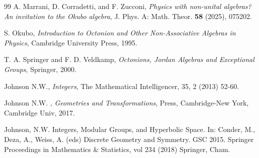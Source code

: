\documentclass{birkjour}
\numberwithin{equation}{section}
\begin{document}
\begin{thebibliography}{99}
A. Marrani, D. Corradetti, and F. Zucconi,
\emph{Physics with non-unital algebras? An invitation to the Okubo algebra},
J. Phys. A: Math. Theor. \textbf{58} (2025), 075202.

S. Okubo,
\emph{Introduction to Octonion and Other Non-Associative Algebras in Physics},
Cambridge University Press, 1995.

T. A. Springer and F. D. Veldkamp,
\emph{Octonions, Jordan Algebras and Exceptional Groups},
Springer, 2000.

Johnson N.W., \emph{Integers}, The Mathematical
Intelligencer, 35, 2 (2013) 52-60.

Johnson N.W. , \emph{Geometries and Transformations},
Press, Cambridge-New York, Cambridge Univ, 2017.

Johnson, N.W. Integers, Modular Groups, and Hyperbolic
Space. In: Conder, M., Deza, A., Weiss, A. (eds) Discrete Geometry
and Symmetry. GSC 2015. Springer Proceedings in Mathematics \& Statistics,
vol 234 (2018) Springer, Cham.

\end{thebibliography}
\end{document}
